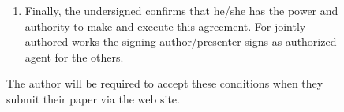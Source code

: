 \documentclass[twocolumn, a4paper,10pt]{article}
\begin{document}
\begin{figure}[ht]
\begin{boxedminipage}{\textwidth}
\begin{enumerate}
\item Finally, the undersigned confirms that he/she has the power and authority to make and execute this agreement. For jointly authored works the signing author/presenter signs as authorized agent for the others.
 \end{enumerate}


\end{boxedminipage}
\caption{The author will be required to accept these conditions when they submit their paper via the web site.}
\label{fig:fig02}
\end{figure}
\end{document}
